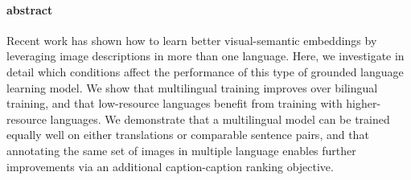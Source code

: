 


%

\paragraph{abstract}

Recent work has shown how to learn better visual-semantic embeddings by leveraging image descriptions in more than one language. Here, we investigate in detail which conditions affect the performance of this type of grounded language learning model. We show that multilingual training improves over bilingual training, and that low-resource languages benefit from training with higher-resource languages. We demonstrate that a multilingual model can be trained equally well on either translations or comparable sentence pairs, and that annotating the same set of images in multiple language enables further improvements via an additional caption-caption ranking objective.



